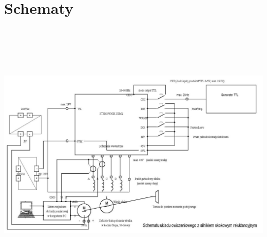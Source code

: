 \documentclass[12pt]{article}
\begin{document}
\section{Schematy}

\begin{center}
	\includegraphics[height=13cm,angle=-90]{../res/img/schemat1.jpg}
\end{center}
\end{document}
